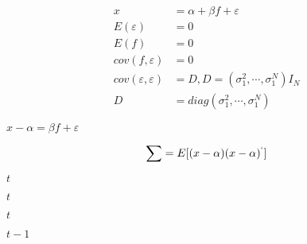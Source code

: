 \documentclass[10pt]{book}
\begin{document}
\begin{mdSnippets}
\begin{mdDisplaySnippet}[241cc0862a03c3f0cb7c5c6ad8ef3f5f]%
\[%
\begin{aligned}
x &= \alpha+\beta f+\varepsilon  \\ 
E(\varepsilon) &= 0\\ 
E(f)&= 0\\ 
 cov(f,\varepsilon)&=0 \\ 
 cov(\varepsilon,\varepsilon)&= D,D=(\sigma_1^2,\cdots ,\sigma_1^N)I_N\\ 
 D&= diag(\sigma_1^2,\cdots ,\sigma_1^N)
\end{aligned}
\]%
\end{mdDisplaySnippet}%
\begin{mdInlineSnippet}%
$x-\alpha=\beta f+\varepsilon$\end{mdInlineSnippet}%
\begin{mdDisplaySnippet}[89044974233b5f858d3acdfb634a2052]%
\[%
\sum=E[(x-\alpha)(x-\alpha)^`]
\]%
\end{mdDisplaySnippet}%
\begin{mdInlineSnippet}[e358efa489f58062f10dd7316b65649e]%
$t$\end{mdInlineSnippet}%
\begin{mdInlineSnippet}[e358efa489f58062f10dd7316b65649e]%
$t$\end{mdInlineSnippet}%
\begin{mdInlineSnippet}[e358efa489f58062f10dd7316b65649e]%
$t$\end{mdInlineSnippet}%
\begin{mdInlineSnippet}[f3e90ce87a25538f5a4be79a0a7c0fa5]%
$t-1$\end{mdInlineSnippet}%

\end{mdSnippets}
\end{document}
